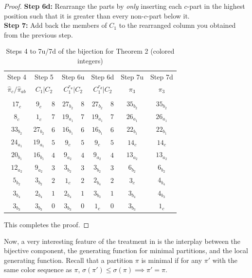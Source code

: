 \documentclass[12pt,a4paper]{amsart}
\theoremstyle{definition}
\theoremstyle{notation}
\theoremstyle{corollary}
\begin{document}
\begin{proof}
\textbf{Step 6d:}
Rearrange the parts by \textit{only} inserting each $c$-part in the highest position such that it is greater than every non-$c$-part below it.\\

\textbf{Step 7:}
Add back the members of $C_1$ to the rearranged column you obtained from the previous step.

\begin{center}
    
\begin{table}[ht]
\caption{Steps 4 to 7u/7d of the bijection for Theorem 2 (colored integers)}
\begin{tabular}{cc|cc|cc|ccc}
    Step 4 & \multicolumn{2}{c}{Step 5} & \multicolumn{2}{c}{Step 6u}& \multicolumn{2}{c}{Step 6d}& Step 7u&Step 7d\\
    $\hat{\pi}_c/\hat{\pi}_{ab}$ & \multicolumn{2}{c}{$C_1|C_2$} & \multicolumn{2}{c}{$C_1^{r_u}|C_2$} & \multicolumn{2}{c}{$C_1^{r_d}|C_2$}& $\pi_3$& $\pi_3$\\
    \hline
    \\
      $17_{c}$& $9_c$&$8$& $27_{b_2} $&$ 8$ &$27_{b_2}$&$8$&$35_{b_2}$&$35_{b_2}$\\
      $8_{c}$& $1_c$&$7$& $19_{a_1} $&$ 7$ &$19_{a_1}$&$7$&$26_{a_1}$&$26_{a_1}$\\
      $33_{b_2}$& $27_{b_2}$&$6$& $16_{b_1} $&$ 6$ &$16_{b_1}$&$6$&$22_{b_1}$&$22_{b_1}$\\
      $24_{a_1}$& $19_{a_1}$&$5$& $9_c $&$ 5$ &$9_c$&$5$&$14_{c}$&$14_{c}$\\
      $20_{b_1}$& $16_{b_1}$&$4$& $9_{a_2} $&$ 4$ &$9_{a_2}$&$4$&$13_{a_2}$&$13_{a_2}$\\
      $12_{a_2}$& $9_{a_2}$&$3$& $3_{b_2} $&$ 3$ &$3_{b_2}$&$3$&$6_{b_2}$&$6_{b_2}$\\
      $5_{b_2}$& $3_{b_2}$&$2$& $1_c $&$ 2$ &$2_{b_4}$&$2$&$3_{c}$&$4_{b_4}$\\
      $3_{b_4}$& $2_{b_4}$&$1$& $2_{b_4} $&$ 1$ &$3_{b_3}$&$1$&$3_{b_4}$&$4_{b_3}$\\
      $3_{b_3}$& $3_{b_3}$&$0$& $3_{b_3} $&$ 0$ &$1_c$&$0$&$3_{b_3}$&$1_{c}$\\
\end{tabular}
\end{table}
\end{center}
This completes the proof.
\end{proof}



Now, a very interesting feature of the treatment in \cite{KAGEABG95} is the interplay between the bijective component, the generating function for minimal partitions, and the local generating function. Recall  that a partition $\pi$ is minimal if for any $\pi'$ with the same color sequence as $\pi$, $\sigma(\pi')\leq\sigma(\pi)\implies\pi'=\pi$. 
\end{document}
